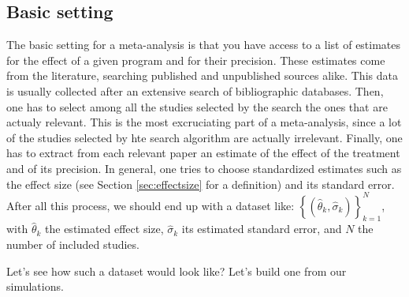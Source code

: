 \documentclass[]{book}
\theoremstyle{definition}
\theoremstyle{definition}
\theoremstyle{definition}
\theoremstyle{remark}
\let\BeginKnitrBlock\begin \let\EndKnitrBlock\end
\begin{document}
\subsection{Basic setting}\label{basic-setting}

The basic setting for a meta-analysis is that you have access to a list
of estimates for the effect of a given program and for their precision.
These estimates come from the literature, searching published and
unpublished sources alike. This data is usually collected after an
extensive search of bibliographic databases. Then, one has to select
among all the studies selected by the search the ones that are actualy
relevant. This is the most excruciating part of a meta-analysis, since a
lot of the studies selected by hte search algorithm are actually
irrelevant. Finally, one has to extract from each relevant paper an
estimate of the effect of the treatment and of its precision. In
general, one tries to choose standardized estimates such as the effect
size (see Section \ref{sec:effectsize} for a definition) and its
standard error. After all this process, we should end up with a dataset
like: \(\left\{(\hat{\theta}_k,\hat{\sigma}_k)\right\}_{k=1}^N\), with
\(\hat{\theta}_k\) the estimated effect size, \(\hat{\sigma}_k\) its
estimated standard error, and \(N\) the number of included studies.

\BeginKnitrBlock{example}
\protect\hypertarget{exm:unnamed-chunk-135}{}{\label{exm:unnamed-chunk-135}
}Let's see how such a dataset would look like? Let's build one from our
simulations.
\EndKnitrBlock{example}
\end{document}
